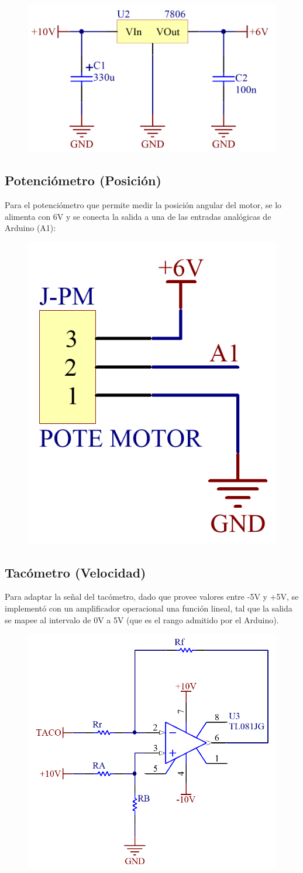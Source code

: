 \documentclass{article}
\begin{document}
\begin{figure}[H]
\centering
\includegraphics[width=0.6\linewidth]{../Images/Regulador.png}
\end{figure}

\subsection{Potenciómetro (Posición)}

Para el potenciómetro que permite medir la posición angular del motor, se lo alimenta con 6V y se conecta la salida a una de las entradas analógicas de Arduino (A1):

\begin{figure}[H]
\centering
\includegraphics[width=0.2\linewidth]{../Images/PoteMotor.png}
\end{figure}

\subsection{Tacómetro (Velocidad)}
Para adaptar la señal del tacómetro, dado que provee valores entre -5V y +5V, se implementó con un amplificador operacional una función lineal, tal que la salida se mapee al intervalo de 0V a 5V (que es el rango admitido por el Arduino).\par

\begin{figure}[H]
\centering
\includegraphics[width=0.45\linewidth]{../Images/ModeloFuncion.png}
\end{figure}
\end{document}
